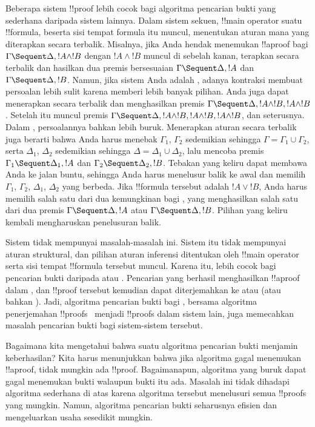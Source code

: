 \documentclass[../../../include/open-logic-section]{subfiles}
\begin{document}
Beberapa sistem !!{proof} lebih cocok bagi algoritma pencarian bukti yang
sederhana daripada sistem lainnya. Dalam sistem sekuen, !!{main operator}
suatu !!{formula}, beserta sisi tempat formula itu muncul, menentukan aturan
mana yang diterapkan secara terbalik. Misalnya, jika Anda hendak menemukan
!!a{proof} bagi $\Gamma \Sequent \Delta, !A \land !B$ dengan
$!A \land !B$ muncul di sebelah kanan, terapkan \RightR{\land} secara
terbalik dan hasilkan dua premis bersesuaian
$\Gamma \Sequent \Delta, !A$ dan $\Gamma \Sequent \Delta, !B$. Namun, jika
sistem Anda adalah , adanya kontraksi membuat persoalan lebih sulit
karena memberi lebih banyak pilihan. Anda juga dapat menerapkan
\RightR{\Contraction} secara terbalik dan menghasilkan premis
$\Gamma \Sequent \Delta, !A \land !B, !A \land !B$. Setelah itu muncul
premis $\Gamma \Sequent \Delta, !A \land !B, !A \land !B, !A \land !B$,
dan seterusnya. Dalam , persoalannya bahkan lebih buruk. Menerapkan
aturan \RightR{\land} secara terbalik juga berarti bahwa Anda harus menebak
$\Gamma_1$, $\Gamma_2$ sedemikian sehingga
$\Gamma = \Gamma_1 \cup \Gamma_2$, serta $\Delta_1$, $\Delta_2$ sedemikian
sehingga $\Delta = \Delta_1 \cup \Delta_2$, lalu mencoba premis
$\Gamma_1 \Sequent \Delta_1, !A$ dan
$\Gamma_2 \Sequent \Delta_2, !B$. Tebakan yang keliru dapat membawa Anda
ke jalan buntu, sehingga Anda harus menelusur balik ke awal dan memilih
$\Gamma_1$, $\Gamma_2$, $\Delta_1$, $\Delta_2$ yang berbeda. Jika
!!{formula} tersebut adalah $!A \lor !B$, Anda harus memilih salah satu dari
dua kemungkinan bagi \RightR{\lor}, yang menghasilkan salah satu dari dua
premis $\Gamma \Sequent \Delta, !A$ atau
$\Gamma \Sequent \Delta, !B$. Pilihan yang keliru kembali mengharuskan
penelusuran balik.

Sistem  tidak mempunyai masalah-masalah ini. Sistem itu tidak
mempunyai aturan struktural, dan pilihan aturan inferensi ditentukan oleh
!!{main operator} serta sisi tempat !!{formula} tersebut muncul. Karena itu,
 lebih cocok bagi pencarian bukti daripada  atau
. Pencarian yang berhasil menghasilkan !!a{proof} dalam
, dan !!{proof} tersebut kemudian dapat diterjemahkan ke 
atau  (atau bahkan ). Jadi, algoritma pencarian bukti bagi
, bersama algoritma penerjemahan !!{proof}s~ menjadi
!!{proof}s dalam sistem lain, juga memecahkan masalah pencarian bukti bagi
sistem-sistem tersebut.

Bagaimana kita mengetahui bahwa suatu algoritma pencarian bukti menjamin
keberhasilan? Kita harus menunjukkan bahwa jika algoritma gagal menemukan
!!a{proof}, tidak mungkin ada !!{proof}. Bagaimanapun, algoritma yang buruk
dapat gagal menemukan bukti walaupun bukti itu ada. Masalah ini tidak
dihadapi algoritma sederhana di atas karena algoritma tersebut menelusuri
semua !!{proof}s yang mungkin. Namun, algoritma pencarian bukti seharusnya
efisien dan mengeluarkan usaha sesedikit mungkin.
\end{document}
